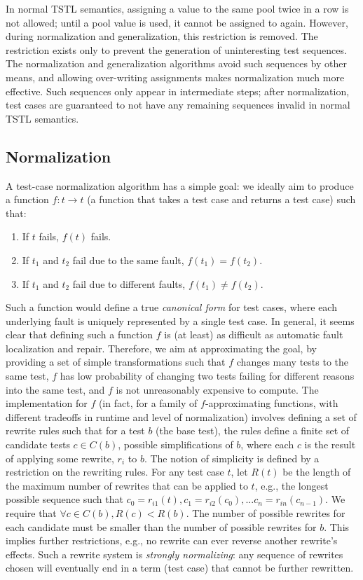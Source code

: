 In normal TSTL semantics, assigning a
value to the same pool twice in a row is not allowed; until a pool
value is used, it cannot be assigned to again.  However, during
normalization and generalization, this restriction is removed.  The
restriction exists only to prevent the generation of uninteresting
test sequences.  The normalization and generalization algorithms avoid
such sequences by other means, and allowing over-writing assignments
makes normalization much more effective.  Such sequences only appear
in intermediate steps; after normalization, test
cases are guaranteed to not have any remaining sequences invalid in
normal TSTL semantics.

\subsection{Normalization}

A test-case normalization algorithm has a simple goal:  we ideally aim to
produce a function $f : t \rightarrow t$ (a function that takes a test
case and returns a test case) such that:

\begin{enumerate}
\item If $t$ fails, $f(t)$ fails.
\item If $t_1$ and $t_2$ fail due to the same fault, $f(t_1) = f(t_2)$.
\item If $t_1$ and $t_2$ fail due to different faults, $f(t_1) \not=
  f(t_2)$.
\end{enumerate}

Such a function would define a true \emph{canonical form} for test cases, where
each underlying fault is uniquely represented by a single test case.
In general, it seems clear that defining such a function $f$ is (at least) as
difficult as automatic fault localization and repair.  Therefore, we
aim at approximating the goal, by providing a set of simple
transformations such that $f$ changes many tests to the same test, $f$
has
low probability of changing two tests failing for different reasons
into the same test, and $f$ is not unreasonably expensive to compute.
The implementation for $f$ (in fact, for a family of $f$-approximating
functions, with different tradeoffs in runtime and level of
normalization) involves defining a set of rewrite rules such that for a
test $b$ (the base test), the rules define a finite set of candidate
tests $c \in C(b)$, possible simplifications of $b$, where each $c$ is
the result of applying some rewrite, $r_i$ to $b$.  The notion of
simplicity is defined by a restriction on the rewriting rules.  For
any test case $t$, let $R(t)$ be the length of the maximum number of
rewrites that can be applied to $t$, e.g., the longest possible
sequence such that $c_0 = r_{i1}(t), c_1 = r_{i2}(c_0), ... c_n = r_{in}(c_{n-1})$. We
require that $\forall c \in C(b), R(c) < R(b)$.  The number of possible
rewrites for each candidate must be smaller than the number of
possible rewrites for $b$.  This implies further restrictions, e.g., no
rewrite can ever reverse another rewrite's effects.  Such a rewrite
system is \emph{strongly normalizing}:  any sequence of rewrites
chosen will eventually end in a term (test case) that cannot be
further rewritten.

